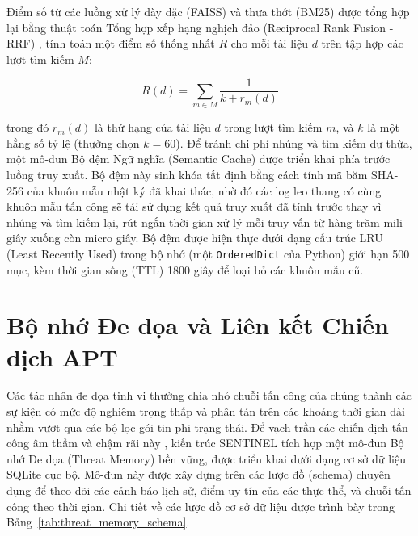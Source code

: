 Điểm số từ các luồng xử lý dày đặc (FAISS) và thưa thớt (BM25) được tổng hợp lại bằng thuật toán Tổng hợp xếp hạng nghịch đảo (Reciprocal Rank Fusion - RRF) \cite{rrf2009}, tính toán một điểm số thống nhất $R$ cho mỗi tài liệu $d$ trên tập hợp các lượt tìm kiếm $M$:

\begin{equation}
    R(d) = \sum_{m \in M} \frac{1}{k + r_m(d)}
\end{equation}

trong đó $r_m(d)$ là thứ hạng của tài liệu $d$ trong lượt tìm kiếm $m$, và $k$ là một hằng số tỷ lệ (thường chọn $k=60$). Để tránh chi phí nhúng và tìm kiếm dư thừa, một mô-đun Bộ đệm Ngữ nghĩa (Semantic Cache) được triển khai phía trước luồng truy xuất. Bộ đệm này sinh khóa tất định bằng cách tính mã băm SHA-256 của khuôn mẫu nhật ký đã khai thác, nhờ đó các log leo thang có cùng khuôn mẫu tấn công sẽ tái sử dụng kết quả truy xuất đã tính trước thay vì nhúng và tìm kiếm lại, rút ngắn thời gian xử lý mỗi truy vấn từ hàng trăm mili giây xuống còn micro giây. Bộ đệm được hiện thực dưới dạng cấu trúc LRU (Least Recently Used) trong bộ nhớ (một \texttt{OrderedDict} của Python) giới hạn 500 mục, kèm thời gian sống (TTL) 1800 giây để loại bỏ các khuôn mẫu cũ.

\section{Bộ nhớ Đe dọa và Liên kết Chiến dịch APT}

Các tác nhân đe dọa tinh vi thường chia nhỏ chuỗi tấn công của chúng thành các sự kiện có mức độ nghiêm trọng thấp và phân tán trên các khoảng thời gian dài nhằm vượt qua các bộ lọc gói tin phi trạng thái. Để vạch trần các chiến dịch tấn công âm thầm và chậm rãi này \cite{apt_stealth2021}, kiến trúc SENTINEL tích hợp một mô-đun Bộ nhớ Đe dọa (Threat Memory) bền vững, được triển khai dưới dạng cơ sở dữ liệu SQLite cục bộ. Mô-đun này được xây dựng trên các lược đồ (schema) chuyên dụng để theo dõi các cảnh báo lịch sử, điểm uy tín của các thực thể, và chuỗi tấn công theo thời gian. Chi tiết về các lược đồ cơ sở dữ liệu được trình bày trong Bảng~\ref{tab:threat_memory_schema}.

